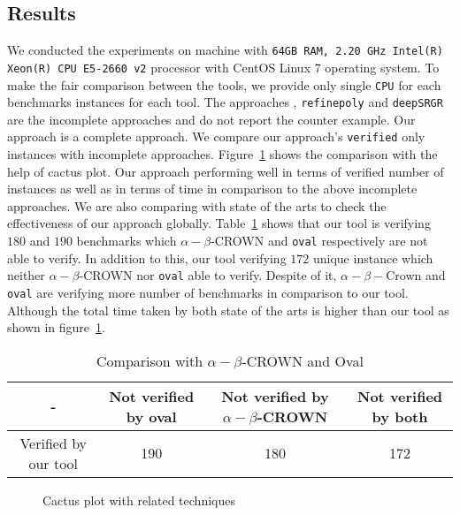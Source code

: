 \subsection{Results}
We conducted the experiments on machine with \texttt{64GB RAM, 2.20 GHz Intel(R) Xeon(R) CPU E5-2660 v2}
processor with CentOS Linux 7 operating system. 
To make the fair comparison between the tools, we provide only single \texttt{CPU} for each benchmarks instances for each tool. 
The approaches \deeppoly{}, \texttt{refinepoly} and \texttt{deepSRGR} are the incomplete approaches and do not report the counter example. 
Our approach is a complete approach. We compare our approach's \texttt{verified} only instances with incomplete approaches. 
Figure~\ref{res:milp_with_milp} shows the comparison with the help of cactus plot. Our approach performing well 
in terms of verified number of instances as well as in terms of time in comparison to the above incomplete approaches. 
We are also comparing with state of the arts to check the effectiveness of our approach globally.
Table~\ref{tb:soacomparison} shows that our tool is verifying $180$ and $190$ benchmarks which $\alpha -\beta$-CROWN and 
\texttt{oval} respectively are not able to verify. In addition to this, our tool verifying $172$ unique instance 
which neither $\alpha -\beta$-CROWN nor \texttt{oval} able to verify.  
Despite of it, $\alpha - \beta-$Crown and \texttt{oval} are verifying more number of benchmarks in comparison to our tool. 
Although the total time taken by both state of the arts is higher than our tool as shown in figure~\ref{res:milp_with_milp}. 


\begin{table}
    \centering
    \begin{tabular}{|c|c|c|c|}
        \hline
        -  & Not verified by oval & Not verified by $\alpha - \beta$-CROWN & Not verified by both \\
        \hline
        Verified by our tool & 190 & 180 & 172 \\
        \hline
    \end{tabular}
    \caption{Comparison with $\alpha - \beta$-CROWN and Oval}
    \label{tb:soacomparison}
\end{table}



\begin{figure}
    \centering
    
    \caption{Cactus plot with related techniques}
    \label{res:milp_with_milp}
\end{figure}


